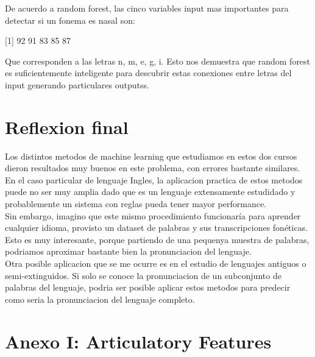 \documentclass[paper=a4, fontsize=11pt]{scrartcl} %
\numberwithin{equation}{section} %
\numberwithin{figure}{section} %
\numberwithin{table}{section} %
\begin{document}
De acuerdo a random forest, las cinco variables input mas importantes para detectar si un fonema es nasal son:

\begin{center}
[1]  92  91  83  85  87
\end{center}

Que corresponden a las letras n, m, e, g, i. Esto nos demuestra que random forest es suficientemente inteligente para descubrir estas conexiones entre letras del input generando particulares outputss.



\section{ Reflexion final }

Los distintos metodos de machine learning que estudiamos en estos dos cursos dieron resultados muy buenos en este problema, con errores bastante similares. En el caso particular de lenguaje Ingles, la aplicacion practica de estos metodos puede no ser muy amplia dado que es un lenguaje extensamente estudidado y probablemente un sistema con reglas pueda tener mayor performance. \\

Sin embargo, imagino que este mismo procedimiento funcionaría para aprender cualquier idioma, provisto un dataset de palabras y sus transcripciones fonéticas. Esto es muy interesante, porque partiendo de una pequenya muestra de palabras, podriamos aproximar bastante bien la pronunciacion del lenguaje. \\

Otra posible aplicacion que se me ocurre es en el estudio de lenguajes antiguos o semi-extinguidos. Si solo se conoce la pronunciacion de un subconjunto de palabras del lenguaje, podria ser posible aplicar estos metodos para predecir como seria la pronunciacion del lenguaje completo.

\newpage

\section { Anexo I: Articulatory Features}
\end{document}
